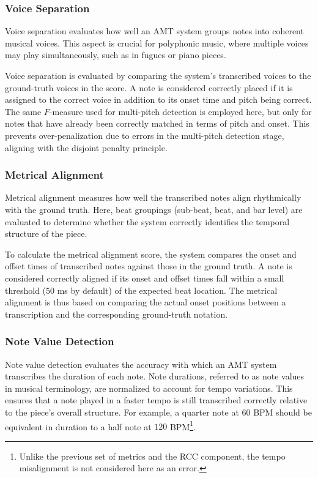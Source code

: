 \subsubsection{Voice Separation}

Voice separation evaluates how well an AMT system groups notes into coherent musical voices. This aspect is crucial for polyphonic music, where multiple voices may play simultaneously, such as in fugues or piano pieces.

Voice separation is evaluated by comparing the system’s transcribed voices to the ground-truth voices in the score. A note is considered correctly placed if it is assigned to the correct voice in addition to its onset time and pitch being correct. The same $F$-measure used for multi-pitch detection is employed here, but only for notes that have already been correctly matched in terms of pitch and onset. This prevents over-penalization due to errors in the multi-pitch detection stage, aligning with the disjoint penalty principle.

\subsubsection{Metrical Alignment}

Metrical alignment measures how well the transcribed notes align rhythmically with the ground truth. Here, beat groupings (sub-beat, beat, and bar level) are evaluated to determine whether the system correctly identifies the temporal structure of the piece.

To calculate the metrical alignment score, the system compares the onset and offset times of transcribed notes against those in the ground truth. A note is considered correctly aligned if its onset and offset times fall within a small threshold ($50$ ms by default) of the expected beat location. The metrical alignment is thus based on comparing the actual onset positions between a transcription and the corresponding ground-truth notation.

\subsubsection{Note Value Detection}

Note value detection evaluates the accuracy with which an AMT system transcribes the duration of each note. Note durations, referred to as note values in musical terminology, are normalized to account for tempo variations. This ensures that a note played in a faster tempo is still transcribed correctly relative to the piece's overall structure. For example, a quarter note at $60$ BPM should be equivalent in duration to a half note at $120$ BPM\footnote{Unlike the previous set of metrics and the RCC component, the tempo misalignment is not considered here as an error.}.

